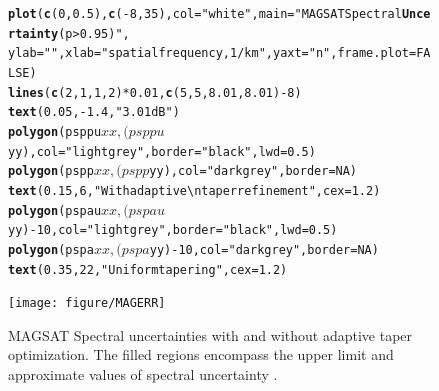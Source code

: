 \documentclass{article}\usepackage{graphicx, color}
\makeatletter
\newcommand{\hlfunctioncall}[1]{\textcolor[rgb]{0.501960784313725,0,0.329411764705882}{\textbf{#1}}}%
\newcommand{\hlstring}[1]{\textcolor[rgb]{0.6,0.6,1}{#1}}%
\newenvironment{kframe}{%
 \def\at@end@of@kframe{}%
 \ifinner\ifhmode%
  \def\at@end@of@kframe{\end{minipage}}%
  \begin{minipage}{\columnwidth}%
 \fi\fi%
 \def\FrameCommand##1{\hskip\@totalleftmargin \hskip-\fboxsep
 \colorbox{shadecolor}{##1}\hskip-\fboxsep
     \hskip-\linewidth \hskip-\@totalleftmargin \hskip\columnwidth}%
 \MakeFramed {\advance\hsize-\width
   \@totalleftmargin\z@ \linewidth\hsize
   \@setminipage}}%
 {\par\unskip\endMakeFramed%
 \at@end@of@kframe}
\newenvironment{knitrout}{}{} %
\makeatother
\begin{document}
\begin{figure}[htb!]
\begin{center}
\begin{knitrout}
\color{fgcolor}\begin{kframe}
\begin{alltt}
\hlfunctioncall{plot}(\hlfunctioncall{c}(0, 0.5), \hlfunctioncall{c}(-8, 35), col = \hlstring{"white"}, main = \hlstring{"MAGSAT Spectral \hlfunctioncall{Uncertainty} (p > 0.95)"}, 
    ylab = \hlstring{""}, xlab = \hlstring{"spatial frequency, 1/km"}, yaxt = \hlstring{"n"}, frame.plot = FALSE)
\hlfunctioncall{lines}(\hlfunctioncall{c}(2, 1, 1, 2) * 0.01, \hlfunctioncall{c}(5, 5, 8.01, 8.01) - 8)
\hlfunctioncall{text}(0.05, -1.4, \hlstring{"3.01 dB"})
\hlfunctioncall{polygon}(psppu$xx, (psppu$yy), col = \hlstring{"light grey"}, border = \hlstring{"black"}, lwd = 0.5)
\hlfunctioncall{polygon}(pspp$xx, (pspp$yy), col = \hlstring{"dark grey"}, border = NA)
\hlfunctioncall{text}(0.15, 6, \hlstring{"With adaptive\textbackslash{}ntaper refinement"}, cex = 1.2)
\hlfunctioncall{polygon}(pspau$xx, (pspau$yy) - 10, col = \hlstring{"light grey"}, border = \hlstring{"black"}, lwd = 0.5)
\hlfunctioncall{polygon}(pspa$xx, (pspa$yy) - 10, col = \hlstring{"dark grey"}, border = NA)
\hlfunctioncall{text}(0.35, 22, \hlstring{"Uniform tapering"}, cex = 1.2)
\end{alltt}
\end{kframe}
\texttt{[image: figure/MAGERR]} 

\end{knitrout}

\caption{MAGSAT Spectral uncertainties with and without adaptive taper optimization.
The filled regions encompass the upper limit and approximate values of 
spectral uncertainty .}
\label{fig:magerr}
\end{center}
\end{figure}
\end{document}
